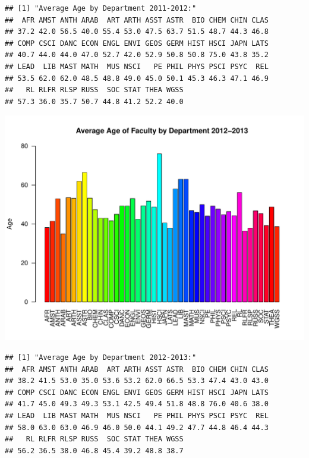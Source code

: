 \documentclass[12pt,a4paper]{article}\usepackage[]{graphicx}\usepackage[]{color}
\makeatletter
\def\maxwidth{ %
  \ifdim\Gin@nat@width>\linewidth
    \linewidth
  \else
    \Gin@nat@width
  \fi
}
\newenvironment{kframe}{%
 \def\at@end@of@kframe{}%
 \ifinner\ifhmode%
  \def\at@end@of@kframe{\end{minipage}}%
  \begin{minipage}{\columnwidth}%
 \fi\fi%
 \def\FrameCommand##1{\hskip\@totalleftmargin \hskip-\fboxsep
 \colorbox{shadecolor}{##1}\hskip-\fboxsep
     \hskip-\linewidth \hskip-\@totalleftmargin \hskip\columnwidth}%
 \MakeFramed {\advance\hsize-\width
   \@totalleftmargin\z@ \linewidth\hsize
   \@setminipage}}%
 {\par\unskip\endMakeFramed%
 \at@end@of@kframe}
\newenvironment{knitrout}{}{} %
\theoremstyle{definition}
\makeatother
\begin{document}
\begin{knitrout}
\begin{kframe}\begin{verbatim}
## [1] "Average Age by Department 2011-2012:"
##  AFR AMST ANTH ARAB  ART ARTH ASST ASTR  BIO CHEM CHIN CLAS 
## 37.2 42.0 56.5 40.0 55.4 53.0 47.5 63.7 51.5 48.7 44.3 46.8 
## COMP CSCI DANC ECON ENGL ENVI GEOS GERM HIST HSCI JAPN LATS 
## 40.7 44.0 44.0 47.0 52.7 42.0 52.9 50.8 50.8 75.0 43.8 35.2 
## LEAD  LIB MAST MATH  MUS NSCI   PE PHIL PHYS PSCI PSYC  REL 
## 53.5 62.0 62.0 48.5 48.8 49.0 45.0 50.1 45.3 46.3 47.1 46.9 
##   RL RLFR RLSP RUSS  SOC STAT THEA WGSS 
## 57.3 36.0 35.7 50.7 44.8 41.2 52.2 40.0
\end{verbatim}
\end{kframe}
\includegraphics[width=\maxwidth]{figure/unnamed-chunk-10-9} 
\begin{kframe}\begin{verbatim}
## [1] "Average Age by Department 2012-2013:"
##  AFR AMST ANTH ARAB  ART ARTH ASST ASTR  BIO CHEM CHIN CLAS 
## 38.2 41.5 53.0 35.0 53.6 53.2 62.0 66.5 53.3 47.4 43.0 43.0 
## COMP CSCI DANC ECON ENGL ENVI GEOS GERM HIST HSCI JAPN LATS 
## 41.7 45.0 49.3 49.3 53.1 42.5 49.4 51.8 48.8 76.0 40.6 38.0 
## LEAD  LIB MAST MATH  MUS NSCI   PE PHIL PHYS PSCI PSYC  REL 
## 58.0 63.0 63.0 46.9 46.0 50.0 44.1 49.2 47.7 44.8 46.4 44.3 
##   RL RLFR RLSP RUSS  SOC STAT THEA WGSS 
## 56.2 36.5 38.0 46.8 45.4 39.2 48.8 38.7
\end{verbatim}
\end{kframe}

\end{knitrout}
\end{document}
